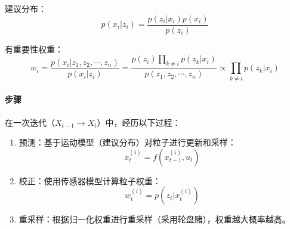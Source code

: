 \documentclass[
12pt, %
a4paper, 
oneside, %
headinclude,footinclude, %
]{scrartcl}
\begin{document}
建议分布：
$$ p(x_i|z_i) = \frac{p(z_i|x_i)p(x_i)}{p(z_i)} $$

有重要性权重：
$$ w_i = \frac{p(x_i|z_1, z_2, \cdots, z_n)}{p(x_i|z_i)} = \frac{p(z_i)\prod_{k \neq i}p(z_k|x_i)}{p(z_1, z_2, \cdots, z_n)} \propto \prod_{k \neq i}p(z_k|x_i) $$
\paragraph{步骤}
在一次迭代（$ X_{t - 1} \rightarrow X_t $）中，经历以下过程：
\begin{enumerate}
\item 预测：基于运动模型（建议分布）对粒子进行更新和采样：
$$ x_t^{(i)} = f(x_{t - 1}^{(i)}, u_t) $$
\item 校正：使用传感器模型计算粒子权重：
$$ w_t^{(i)} = p(z_t|x_t^{(i)}) $$
\item 重采样：根据归一化权重进行重采样（采用轮盘赌），权重越大概率越高。
\end{enumerate}
\end{document}
